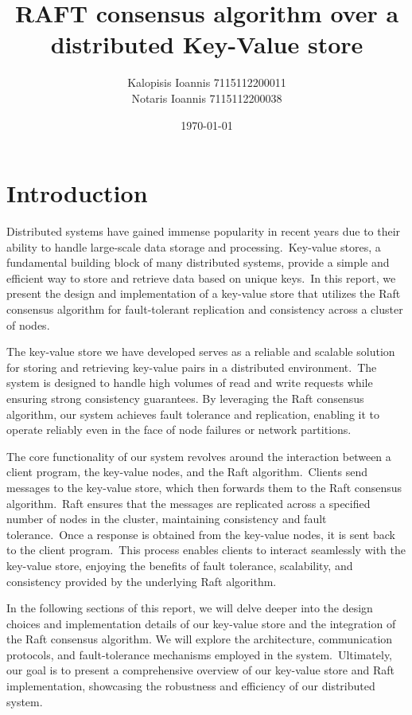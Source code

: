 \documentclass{article}
\begin{document}
\title{RAFT consensus algorithm over a distributed Key-Value store}
\author{
Kalopisis Ioannis 7115112200011\\
Notaris  Ioannis 7115112200038}
\date{\today}


\maketitle
\newpage
\tableofcontents

\newpage

\section{Introduction}
Distributed systems have gained immense popularity in recent years due to their ability to
handle large-scale data storage and processing.\ Key-value stores, a fundamental building
block of many distributed systems, provide a simple and efficient way to store and retrieve
data based on unique keys.\ In this report, we present the design and implementation of a
key-value store that utilizes the Raft consensus algorithm for fault-tolerant replication
and consistency across a cluster of nodes.

The key-value store we have developed serves as a reliable and scalable solution for storing
and retrieving key-value pairs in a distributed environment.\ The system is designed to handle
high volumes of read and write requests while ensuring strong consistency guarantees.
By leveraging the Raft consensus algorithm, our system achieves fault tolerance and replication,
enabling it to operate reliably even in the face of node failures or network partitions.

The core functionality of our system revolves around the interaction between a client program,
the key-value nodes, and the Raft algorithm.\ Clients send messages to the key-value store,
which then forwards them to the Raft consensus algorithm.\ Raft ensures that the messages are
replicated across a specified number of nodes in the cluster, maintaining consistency and
fault tolerance.\ Once a response is obtained from the key-value nodes, it is sent back to the
client program.\ This process enables clients to interact seamlessly with the key-value store,
enjoying the benefits of fault tolerance, scalability, and consistency provided by the
underlying Raft algorithm.

In the following sections of this report, we will delve deeper into the design choices and
implementation details of our key-value store and the integration of the Raft consensus algorithm.
We will explore the architecture, communication protocols, and fault-tolerance mechanisms employed
in the system.\  Ultimately, our goal is to present a comprehensive overview of our key-value
store and Raft implementation, showcasing the robustness and efficiency of our distributed system.
\end{document}
